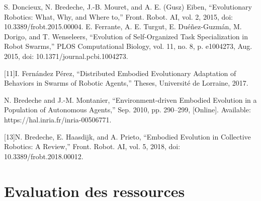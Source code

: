 \documentclass[11pt]{article}
\begin{document}
\flushleft
\justify
[9]S. Doncieux, N. Bredeche, J.-B. Mouret, and A. E. (Gusz) Eiben, “Evolutionary Robotics: What, Why, and Where to,” Front. Robot. AI, vol. 2, 2015, doi: 10.3389/frobt.2015.00004.
\flushleft
\justify
[10]E. Ferrante, A. E. Turgut, E. Duéñez-Guzmán, M. Dorigo, and T. Wenseleers, “Evolution of Self-Organized Task Specialization in Robot Swarms,” PLOS Computational Biology, vol. 11, no. 8, p. e1004273, Aug. 2015, doi: 10.1371/journal.pcbi.1004273.
\flushleft
\justify

[11]I. Fernández Pérez, “Distributed Embodied Evolutionary Adaptation of Behaviors in Swarms of Robotic Agents,” Theses, Université de Lorraine, 2017.

\flushleft
\justify
[12]N. Bredeche and J.-M. Montanier, “Environment-driven Embodied Evolution in a Population of Autonomous Agents,” Sep. 2010, pp. 290–299, [Online]. Available: https://hal.inria.fr/inria-00506771.
\flushleft
\justify

[13]N. Bredeche, E. Haasdijk, and A. Prieto, “Embodied Evolution in Collective Robotics: A Review,” Front. Robot. AI, vol. 5, 2018, doi: 10.3389/frobt.2018.00012.

\section{Evaluation des ressources}
\flushleft \justify
\end{document}
